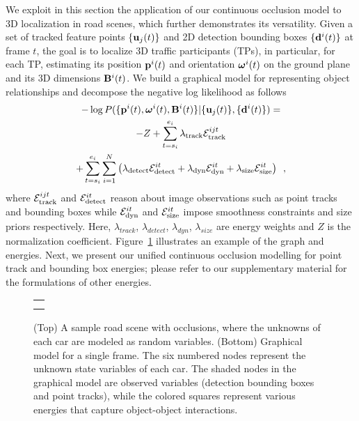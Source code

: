 We exploit in this section the application of our continuous occlusion model to 3D localization in road scenes, which further demonstrates its versatility. Given a set of tracked feature points $\{\mathbf{u}_j(t)\}$ and 2D detection bounding boxes $\{\mathbf{d}^{i}(t)\}$ at frame $t$, the goal is to localize 3D traffic participants (TPs), in particular, for each TP, estimating its position $\mathbf{p}^i(t)$ and orientation $\bm{\omega}^i(t)$ on the ground plane and its 3D dimensions $\mathbf{B}^i(t)$. We build a graphical model for representing object relationships and decompose the negative log likelihood as follows
%
\begin{multline}
  -\log{P(\{ \mathbf{p}^i(t) , \bm{\omega}^i(t) , \mathbf{B}^i(t) \} | \{\mathbf{u}_j(t)\} , \{\mathbf{d}^{i}(t)\} )} = \\
  -Z 
   + \sum_{t=s_i}^{e_i} \lambda_{\text{track}}\mathcal{E}^{ijt}_{\text{track}}
  \\
  + 
  \sum_{t=s_i}^{e_i}
  \sum_{i=1}^N  
  \left( 
  \lambda_{\text{detect}}\mathcal{E}^{it}_{\text{detect}}
  + \lambda_{\text{dyn}}\mathcal{E}^{it}_{\text{dyn}}
  + \lambda_{\text{size}}\mathcal{E}^{it}_{\text{size}}
\right)
  \enspace,
\end{multline}
%
where $\mathcal{E}^{ijt}_{\text{track}}$ and $\mathcal{E}^{it}_{\text{detect}}$ reason about image observations such as point tracks and bounding boxes while $\mathcal{E}^{it}_{\text{dyn}}$  and $\mathcal{E}^{it}_{\text{size}}$ impose smoothness constraints and size priors respectively. Here, $\lambda_{track}$, $\lambda_{detect}$, $\lambda_{dyn}$, $\lambda_{size}$ are energy weights and $Z$ is the normalization coefficient. Figure~\ref{fig:graphmodel} illustrates an example of the graph and energies. Next, we present our unified continuous occlusion modelling for point track and bounding box energies; please refer to our supplementary material for the formulations of other energies.

\begin{figure}
  \centering
  \begin{tabular}{c}
    \newcommand{\imagewidth}{7.5cm}
      \hspace{-0.8cm}
     \\
      \hspace{-0.8cm}
    
  \end{tabular}
  \caption{\small (Top) A sample road scene with occlusions, where the unknowns of each car are modeled as random variables. (Bottom) Graphical model for a single frame. The six numbered nodes represent the unknown state variables of each car. The shaded nodes in the graphical model are observed variables (detection bounding boxes and point tracks), while the colored squares represent various energies that capture object-object interactions.}
  \label{fig:graphmodel}
\end{figure}



